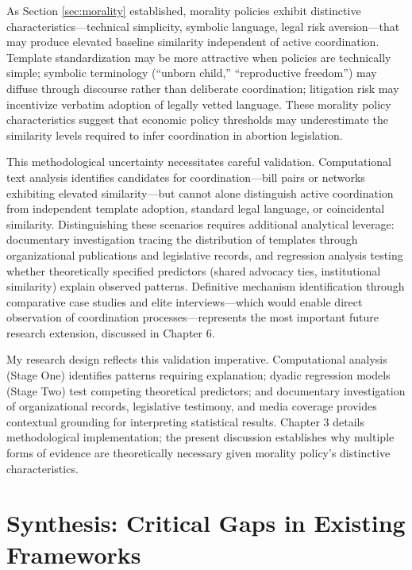 As Section \ref{sec:morality} established, morality policies exhibit distinctive characteristics---technical simplicity, symbolic language, legal risk aversion---that may produce elevated baseline similarity independent of active coordination. Template standardization may be more attractive when policies are technically simple; symbolic terminology (``unborn child,'' ``reproductive freedom'') may diffuse through discourse rather than deliberate coordination; litigation risk may incentivize verbatim adoption of legally vetted language. These morality policy characteristics suggest that economic policy thresholds may underestimate the similarity levels required to infer coordination in abortion legislation.

This methodological uncertainty necessitates careful validation. Computational text analysis identifies candidates for coordination---bill pairs or networks exhibiting elevated similarity---but cannot alone distinguish active coordination from independent template adoption, standard legal language, or coincidental similarity. Distinguishing these scenarios requires additional analytical leverage: documentary investigation tracing the distribution of templates through organizational publications and legislative records, and regression analysis testing whether theoretically specified predictors (shared advocacy ties, institutional similarity) explain observed patterns. Definitive mechanism identification through comparative case studies and elite interviews---which would enable direct observation of coordination processes---represents the most important future research extension, discussed in Chapter 6.

My research design reflects this validation imperative. Computational analysis (Stage One) identifies patterns requiring explanation; dyadic regression models (Stage Two) test competing theoretical predictors; and documentary investigation of organizational records, legislative testimony, and media coverage provides contextual grounding for interpreting statistical results. Chapter 3 details methodological implementation; the present discussion establishes why multiple forms of evidence are theoretically necessary given morality policy's distinctive characteristics.

\section{Synthesis: Critical Gaps in Existing Frameworks}
\label{sec:gaps}

